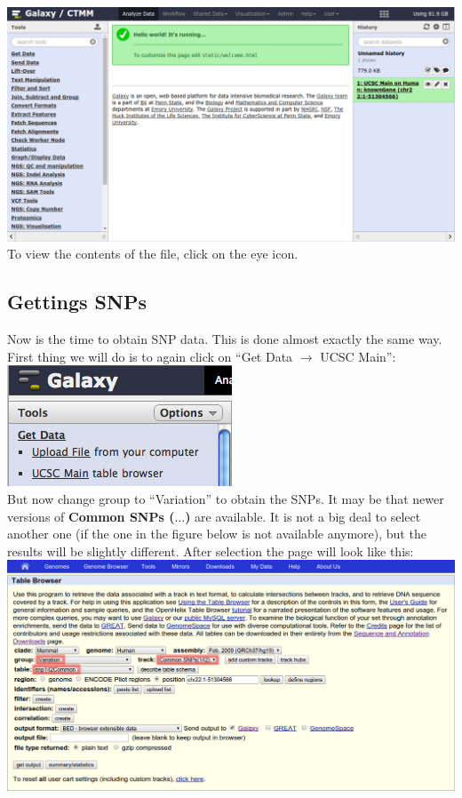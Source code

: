 \documentclass[11pt,a4paper]{article}
\begin{document}
\includegraphics[width=\textwidth]{figures/101_04}\\
To view the contents of the file, click on the eye icon.

\subsection{Gettings SNPs}
Now is the time to obtain SNP data. This is done almost exactly the same way. First thing we will do is to again click on ``Get Data $\rightarrow$ UCSC Main'':\\
\includegraphics[scale=0.65]{figures/101_01}\\
But now change group to ``Variation'' to obtain the SNPs. It may be that newer versions of \textbf{Common SNPs ($\ldots$)} are available. It is not a big deal to select another one (if the one in the figure below is not available anymore), but the results will be slightly different. After selection the page will look like this:\\
\includegraphics[width=\textwidth]{figures/101_06}\\
\end{document}
